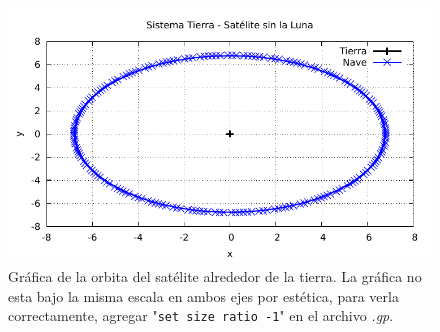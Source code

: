 \begin{figure}[H]
	\centering
	\includegraphics[scale=1]{../img/ej5-16-1.pdf}
	\caption{Gráfica de la orbita del satélite alrededor de la tierra. La gráfica no esta bajo la misma escala en ambos ejes por estética, para verla correctamente, agregar "\texttt{set size ratio -1}" en el archivo \textit{.gp}.}
\end{figure}

